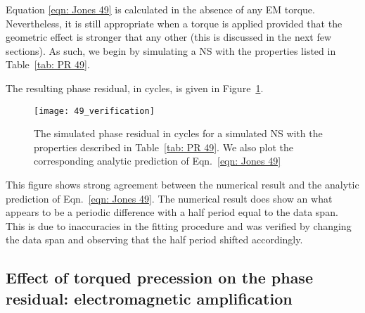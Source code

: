 \documentclass[../full_thesis/full_thesis.tex]{subfiles}
\begin{document}
Equation \eqref{eqn: Jones 49} is calculated in the absence of any EM torque.
Nevertheless, it is still appropriate when a torque is applied provided
that the geometric effect is stronger that any other (this is discussed in
the next few sections). As such, we begin by simulating a NS with the properties
listed in Table~\ref{tab: PR 49}.
\begin{table}
\centering

\caption{Simulation parameters used for the phase residual plotted in Figure~\ref{fig: PR 49}}
\label{tab: PR 49}
\end{table}
The resulting phase residual, in cycles, is
given in Figure~\ref{fig: PR 49}.
\begin{figure}[htb]
\centering
\texttt{[image: 49\_verification]}
\caption{The simulated phase residual in cycles for a simulated NS with the
properties described in Table~\ref{tab: PR 49}. We also plot the corresponding
analytic prediction of Eqn.~\eqref{eqn: Jones 49}}
\label{fig: PR 49}
\end{figure}

This figure shows strong agreement between the numerical result and the
analytic prediction of Eqn.~\eqref{eqn: Jones 49}. The numerical result does
show an what appears to be a periodic difference with a half period equal to
the data span. This is due to inaccuracies in the fitting procedure and was
verified by changing the data span and observing that the half period shifted
accordingly.


\subsection{Effect of torqued precession on the phase residual: electromagnetic amplification}
\label{sec: phase residual torqued}
\end{document}

